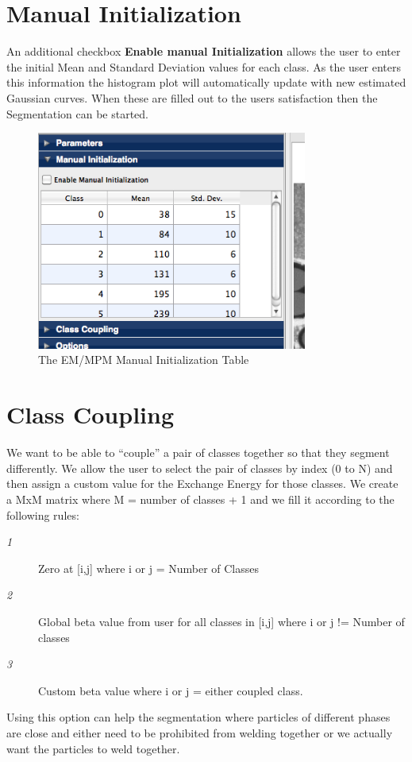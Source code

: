 \documentclass[12pt,oneside]{book}
\begin{document}
\section{Manual Initialization}
An additional checkbox {\bfseries Enable manual Initialization } allows the user to enter the initial Mean and Standard Deviation values for each class. As the user enters this information the histogram plot will automatically update with new estimated Gaussian curves. When these are filled out to the users satisfaction then the Segmentation can be started.
\begin{figure}[htbp]
\begin{center}
\includegraphics[width=3.5in]{images/Untitled5.png}
\caption{The EM/MPM Manual Initialization Table}
\label{Untitled5}
\end{center}
\end{figure}


\section{Class Coupling}
 We want to be able to ``couple'' a pair of classes together so that they segment differently. We allow the user to select the pair of classes by index (0 to N) and then assign a custom value for the Exchange Energy for those classes. We create a MxM matrix where M = number of classes + 1 and we fill it according to the following rules:
 
\begin{description}
\item[{\itshape 1}] Zero at [i,j] where i or j = Number of Classes
\item[{\itshape 2}] Global beta value from user for all classes in [i,j] where i or j != Number of classes
\item[{\itshape 3}] Custom beta value where i or j = either coupled class.
\end{description}
Using this option can help the segmentation where particles of different phases are close and either need to be prohibited from welding together or we actually want the particles to weld together.
\end{document}
